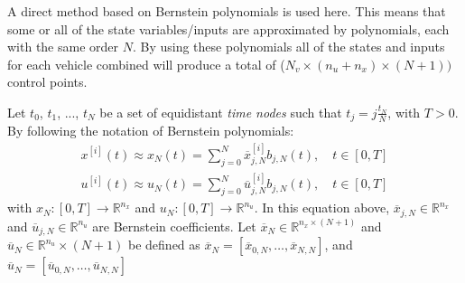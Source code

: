 \par A direct method based on Bernstein polynomials is used here. This means that some or all of the state variables/inputs are approximated by polynomials, each with the same order $N$. By using these polynomials all of the states and inputs for each vehicle combined will produce a total of ($N_v \times (n_u+n_x)\times (N+1))$ control points.
\par Let $t_0$, $t_1$, ..., $t_N$ be a set of equidistant \textit{time nodes} such that $t_j= j\frac{t_N}{N}$, with $T>0$. By following the notation of Bernstein polynomials:
\begin{equation}
    \begin{gathered}
        x^{[i]}(t) \approx x_N(t) = \sum_{j=0}^N \overline{x}^{[i]}_{j,N} b_{j,N}(t), \quad t\in[0,T] \\
        u^{[i]}(t) \approx u_N(t) = \sum_{j=0}^N \overline{u}^{[i]}_{j,N} b_{j,N}(t), \quad t\in[0,T]
    \end{gathered}
\end{equation}
with $x_N: [0,T]\rightarrow \mathbb{R}^{n_x}$ and $u_N:[0,T]\rightarrow \mathbb{R}^{n_u}$. In this equation above, $\overline{x}_{j,N}\in \mathbb{R}^{n_x}$ and $\overline{u}_{j,N}\in \mathbb{R}^{n_u}$ are Bernstein coefficients. Let $\overline{x}_N\in \mathbb{R}^{n_x\times (N+1)}$ and $\overline{u}_N\in \mathbb{R}^{n_u}\times(N+1)$ be defined as $\overline{x}_N = [\overline{x}_{0,N},\dots, \overline{x}_{N,N}]$, and $\overline{u}_N = [\overline{u}_{0,N},\dots, \overline{u}_{N,N}]$

